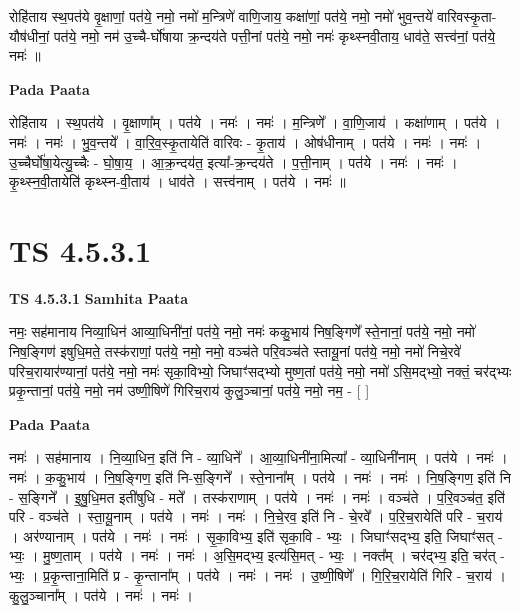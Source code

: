 \documentclass[17pt]{extarticle}
\begin{document}
रोहि॑ताय स्थ॒पत॑ये वृ॒क्षाणां॒ पत॑ये॒ नमो॒                                      नमो॑ म॒न्त्रिणे॑ वाणि॒जाय॒ कक्षा॑णां॒ पत॑ये॒ नमो॒                          नमो॑ भुव॒न्तये॑ वारिवस्कृ॒ता-यौष॑धीनां॒ पत॑ये॒ नमो॒   नम॑ उ॒च्चै-र्घो॑षाया क्र॒न्दय॑ते पत्ती॒नां पत॑ये॒ नमो॒                    नमः॑ कृथ्स्नवी॒ताय॒ धाव॑ते॒ सत्त्व॑नां॒ पत॑ये॒ नमः॑ ॥ \newline

\textbf{Pada Paata} \newline

रोहि॑ताय । स्थ॒पत॑ये । वृ॒क्षाणा᳚म् । पत॑ये । नमः॑ । नमः॑ । म॒न्त्रिणे᳚ । वा॒णि॒जाय॑ । कक्षा॑णाम् । पत॑ये । नमः॑ । नमः॑ । भु॒व॒न्तये᳚ । वा॒रि॒व॒स्कृ॒तायेति॑ वारिवः - कृ॒ताय॑ । ओष॑धीनाम् । पत॑ये । नमः॑ । नमः॑ । उ॒च्चैर्घो॑षा॒येत्यु॒च्चैः - घो॒षा॒य॒ । आ॒क्र॒न्दय॑त॒ इत्या᳚-क्र॒न्दय॑ते । प॒त्ती॒नाम् । पत॑ये । नमः॑ । नमः॑ । कृ॒थ्स्न॒वी॒तायेति॑ कृथ्स्न-वी॒ताय॑ । धाव॑ते । सत्त्व॑नाम् । पत॑ये । नमः॑ ॥  \newline





\section{ TS 4.5.3.1 }

\textbf{TS 4.5.3.1 } \newline
\textbf{Samhita Paata} \newline

नमः॒ सह॑मानाय निव्या॒धिन॑ आव्या॒धिनी॑नां॒ पत॑ये॒ नमो॒          नमः॑ ककु॒भाय॑ निष॒ङ्गिणे᳚ स्ते॒नानां॒ पत॑ये॒ नमो॒                       नमो॑ निष॒ङ्गिण॑ इषुधि॒मते॒ तस्क॑राणां॒ पत॑ये॒ नमो॒           नमो॒ वञ्च॑ते परि॒वञ्च॑ते स्तायू॒नां पत॑ये॒ नमो॒                                         नमो॑ निचे॒रवे॑ परिच॒रायार॑ण्यानां॒ पत॑ये॒ नमो॒                                   नमः॑ सृका॒विभ्यो॒ जिघाꣳ॑सद्भ्यो मुष्ण॒तां पत॑ये॒ नमो॒                   नमो॑ ऽसि॒मद्भ्यो॒ नक्तं॒ चर॑द्भ्यः प्रकृ॒न्तानां॒ पत॑ये॒ नमो॒ नम॑ उष्णी॒षिणे॑ गिरिच॒राय॑ कुलु॒ञ्चानां॒ पत॑ये॒ नमो॒ नम॒ - [  ] \newline

\textbf{Pada Paata} \newline

नमः॑ । सह॑मानाय । नि॒व्या॒धिन॒ इति॑ नि - व्या॒धिने᳚ । आ॒व्या॒धिनी॑ना॒मित्या᳚ - व्या॒धिनी॑नाम् । पत॑ये । नमः॑ । नमः॑ । क॒कु॒भाय॑ । नि॒ष॒ङ्गिण॒ इति॑ नि-स॒ङ्गिने᳚ । स्ते॒नाना᳚म् । पत॑ये । नमः॑ । नमः॑ । नि॒ष॒ङ्गिण॒ इति॑ नि - स॒ङ्गिने᳚ । इ॒षु॒धि॒मत इती॑षुधि - मते᳚ । तस्क॑राणाम् । पत॑ये । नमः॑ । नमः॑ । वञ्च॑ते । प॒रि॒वञ्च॑त॒ इति॑ परि - वञ्च॑ते । स्ता॒यू॒नाम् । पत॑ये । नमः॑ । नमः॑ । नि॒चे॒रव॒ इति॑ नि - चे॒रवे᳚ । प॒रि॒च॒रायेति॑ परि - च॒राय॑ । अर॑ण्यानाम् । पत॑ये । नमः॑ । नमः॑ । सृ॒का॒विभ्य॒ इति॑ सृका॒वि - भ्यः॒ । जिघाꣳ॑सद्भ्य॒ इति॒ जिघाꣳ॑सत् - भ्यः॒ । मु॒ष्ण॒ताम् । पत॑ये । नमः॑ । नमः॑ । अ॒सि॒मद्भ्य॒ इत्य॑सि॒मत् - भ्यः॒ । नक्त᳚म् । चर॑द्भ्य॒ इति॒ चर॑त् - भ्यः॒ । प्र॒कृ॒न्ताना॒मिति॑ प्र - कृ॒न्ताना᳚म् । पत॑ये । नमः॑ । नमः॑ । उ॒ष्णी॒षिणे᳚ । गि॒रि॒च॒रायेति॑ गिरि - च॒राय॑ । कु॒लु॒ञ्चाना᳚म् । पत॑ये । नमः॑ । नमः॑ ।  \newline
\end{document}
